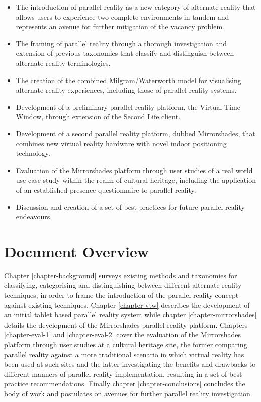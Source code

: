 \begin{itemize}
	\item The introduction of parallel reality as a new category of alternate reality that allows users to experience two complete environments in tandem and represents an avenue for further mitigation of the vacancy problem.
	\item The framing of parallel reality through a thorough investigation and extension of previous taxonomies that classify and distinguish between alternate reality terminologies.
	\item The creation of the combined Milgram/Waterworth model for visualising alternate reality experiences, including those of parallel reality systems.
	\item Development of a preliminary parallel reality platform, the Virtual Time Window, through extension of the Second Life client.
	\item Development of a second parallel reality platform, dubbed Mirrorshades, that combines new virtual reality hardware with novel indoor positioning technology.
	\item Evaluation of the Mirrorshades platform through user studies of a real world use case study within the realm of cultural heritage, including the application of an established presence questionnaire to parallel reality.
	\item Discussion and creation of a set of best practices for future parallel reality endeavours.
\end{itemize}


\section{Document Overview}

Chapter \ref{chapter-background} surveys existing methods and taxonomies for classifying, categorising and distinguishing between different alternate reality techniques, in order to frame the introduction of the parallel reality concept against existing techniques. Chapter \ref{chapter-vtw} describes the development of an initial tablet based parallel reality system while chapter \ref{chapter-mirrorshades} details the development of the Mirrorshades parallel reality platform. Chapters \ref{chapter-eval-1} and \ref{chapter-eval-2} cover the evaluation of the Mirrorshades platform through user studies at a cultural heritage site, the former comparing parallel reality against a more traditional scenario in which virtual reality has been used at such sites and the latter investigating the benefits and drawbacks to different manners of parallel reality implementation, resulting in a set of best practice recommendations. Finally chapter \ref{chapter-conclusions} concludes the body of work and postulates on avenues for further parallel reality investigation.

